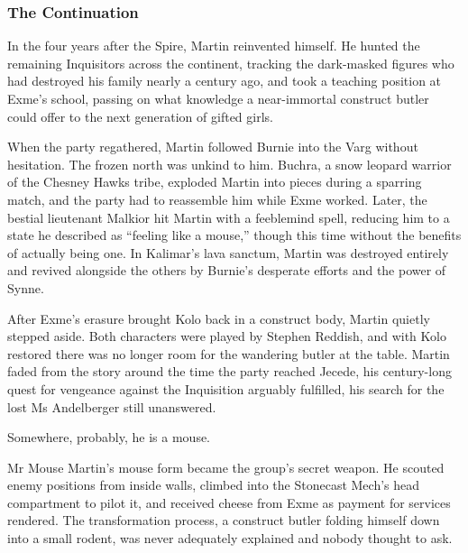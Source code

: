 \subsubsection{The Continuation}

In the four years after the Spire, Martin reinvented himself.  He hunted the remaining Inquisitors across the continent, tracking the dark-masked figures who had destroyed his family nearly a century ago, and took a teaching position at Exme's school, passing on what knowledge a near-immortal construct butler could offer to the next generation of gifted girls.

When the party regathered, Martin followed Burnie into the Varg without hesitation.  The frozen north was unkind to him.  Buchra, a snow leopard warrior of the Chesney Hawks tribe, exploded Martin into pieces during a sparring match, and the party had to reassemble him while Exme worked.  Later, the bestial lieutenant Malkior hit Martin with a feeblemind spell, reducing him to a state he described as ``feeling like a mouse,'' though this time without the benefits of actually being one.  In Kalimar's lava sanctum, Martin was destroyed entirely and revived alongside the others by Burnie's desperate efforts and the power of Synne.

After Exme's erasure brought Kolo back in a construct body, Martin quietly stepped aside.  Both characters were played by Stephen Reddish, and with Kolo restored there was no longer room for the wandering butler at the table.  Martin faded from the story around the time the party reached Jecede, his century-long quest for vengeance against the Inquisition arguably fulfilled, his search for the lost Ms Andelberger still unanswered.

Somewhere, probably, he is a mouse.

\begin{DndSidebar}{Mr Mouse}
Martin's mouse form became the group's secret weapon.  He scouted enemy positions from inside walls, climbed into the Stonecast Mech's head compartment to pilot it, and received cheese from Exme as payment for services rendered.  The transformation process, a construct butler folding himself down into a small rodent, was never adequately explained and nobody thought to ask.
\end{DndSidebar}

\clearpage